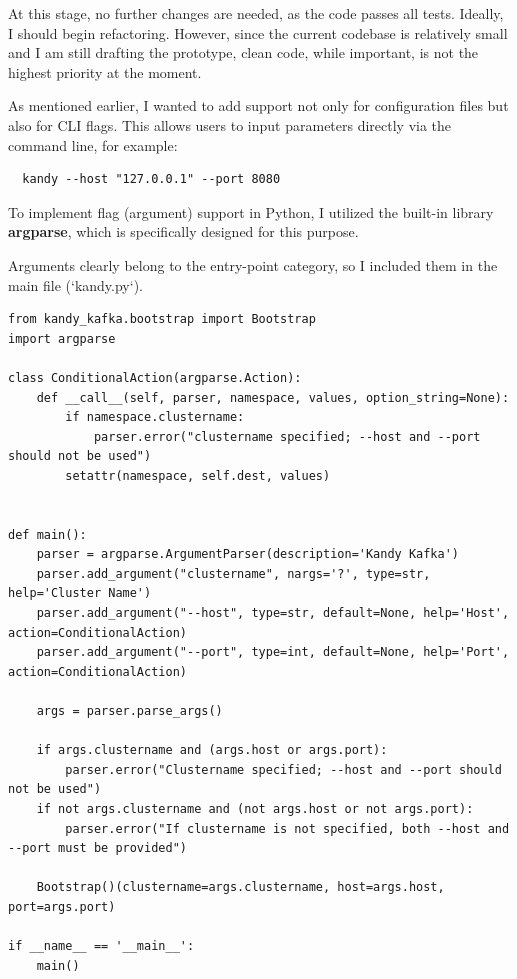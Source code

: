 \documentclass[10pt , a4paper]{report}
\newenvironment{code}{\captionsetup{type=listing}}{}
\begin{document}
At this stage, no further changes are needed, as the code passes all tests. Ideally, I should begin refactoring. However, since the current codebase is relatively small and I am still drafting the prototype, clean code, while important, is not the highest priority at the moment.

As mentioned earlier, I wanted to add support not only for configuration files but also for CLI flags. This allows users to input parameters directly via the command line, for example:

\begin{code}
  \begin{verbatim}
  kandy --host "127.0.0.1" --port 8080
  \end{verbatim}
\end{code}

To implement flag (argument) support in Python, I utilized the built-in library \textbf{argparse}, which is specifically designed for this purpose.

Arguments clearly belong to the entry-point category, so I included them in the main file (`kandy.py`).

\begin{code}
  \begin{verbatim}
from kandy_kafka.bootstrap import Bootstrap
import argparse

class ConditionalAction(argparse.Action):
    def __call__(self, parser, namespace, values, option_string=None):
        if namespace.clustername:
            parser.error("clustername specified; --host and --port should not be used")
        setattr(namespace, self.dest, values)


def main():
    parser = argparse.ArgumentParser(description='Kandy Kafka')
    parser.add_argument("clustername", nargs='?', type=str, help='Cluster Name')
    parser.add_argument("--host", type=str, default=None, help='Host', action=ConditionalAction)
    parser.add_argument("--port", type=int, default=None, help='Port', action=ConditionalAction)

    args = parser.parse_args()

    if args.clustername and (args.host or args.port):
        parser.error("Clustername specified; --host and --port should not be used")
    if not args.clustername and (not args.host or not args.port):
        parser.error("If clustername is not specified, both --host and --port must be provided")

    Bootstrap()(clustername=args.clustername, host=args.host, port=args.port)

if __name__ == '__main__':
    main()
  \end{verbatim}
\end{code}
\end{document}

